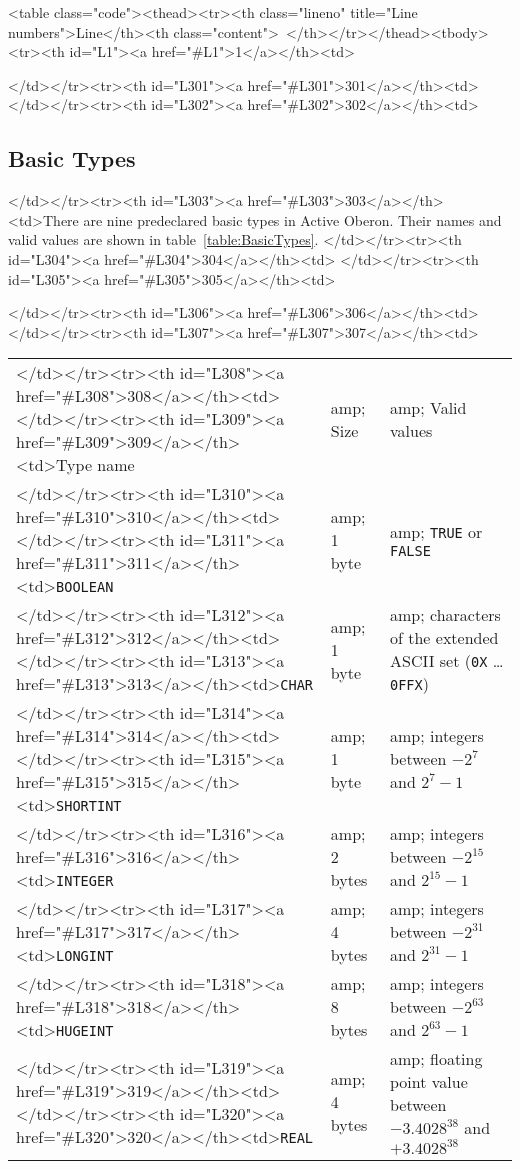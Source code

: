 <table class="code"><thead><tr><th class="lineno" title="Line numbers">Line</th><th class="content"> </th></tr></thead><tbody><tr><th id="L1"><a href="#L1">1</a></th><td>\documentclass[a4paper,11pt]{article}
\begin{document}
</td></tr><tr><th id="L301"><a href="#L301">301</a></th><td>
</td></tr><tr><th id="L302"><a href="#L302">302</a></th><td>\subsection{Basic Types}\label{section:BasicTypes}
</td></tr><tr><th id="L303"><a href="#L303">303</a></th><td>There are nine predeclared basic types in Active Oberon. Their names and valid values are shown in table~\ref{table:BasicTypes}.
</td></tr><tr><th id="L304"><a href="#L304">304</a></th><td>
</td></tr><tr><th id="L305"><a href="#L305">305</a></th><td>\begin{table}[h!]
</td></tr><tr><th id="L306"><a href="#L306">306</a></th><td>\centering
</td></tr><tr><th id="L307"><a href="#L307">307</a></th><td>\begin{tabular}{|l|l|l|}
</td></tr><tr><th id="L308"><a href="#L308">308</a></th><td>\hline
</td></tr><tr><th id="L309"><a href="#L309">309</a></th><td>Type name &amp; Size &amp; Valid values \\
</td></tr><tr><th id="L310"><a href="#L310">310</a></th><td>\hline\hline
</td></tr><tr><th id="L311"><a href="#L311">311</a></th><td>\verb+BOOLEAN+ &amp; 1 byte &amp; \verb+TRUE+ or \verb+FALSE+ \\
</td></tr><tr><th id="L312"><a href="#L312">312</a></th><td>\hline
</td></tr><tr><th id="L313"><a href="#L313">313</a></th><td>\verb+CHAR+ &amp; 1 byte &amp; characters of the extended ASCII set (\verb+0X+ \ldots \verb+0FFX+) \\
</td></tr><tr><th id="L314"><a href="#L314">314</a></th><td>\hline
</td></tr><tr><th id="L315"><a href="#L315">315</a></th><td>\verb+SHORTINT+ &amp; 1 byte &amp; integers between $-2^{7}$ and $2^{7}-1$ \\
</td></tr><tr><th id="L316"><a href="#L316">316</a></th><td>\verb+INTEGER+ &amp; 2 bytes &amp; integers between $-2^{15}$ and $2^{15}-1$ \\
</td></tr><tr><th id="L317"><a href="#L317">317</a></th><td>\verb+LONGINT+ &amp; 4 bytes &amp; integers between $-2^{31}$ and $2^{31}-1$ \\
</td></tr><tr><th id="L318"><a href="#L318">318</a></th><td>\verb+HUGEINT+ &amp; 8 bytes &amp; integers between $-2^{63}$ and $2^{63}-1$ \\
</td></tr><tr><th id="L319"><a href="#L319">319</a></th><td>\hline
</td></tr><tr><th id="L320"><a href="#L320">320</a></th><td>\verb+REAL+ &amp; 4 bytes &amp; floating point value between $-3.4028^{38}$ and $+3.4028^{38}$ \\

\end{tabular}
\end{table}
\end{document}
